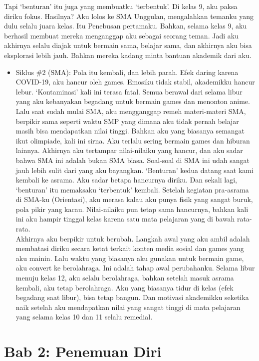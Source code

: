 \documentclass[
  letterpaper,
  DIV=11,
  numbers=noendperiod]{scrreprt}
\providecommand{\tightlist}{%
  \setlength{\itemsep}{0pt}\setlength{\parskip}{0pt}}
\begin{document}
Tapi `benturan' itu juga yang membuatku `terbentuk'. Di kelas 9, aku
paksa diriku fokus. Hasilnya? Aku lolos ke SMA Unggulan, mengalahkan
temanku yang dulu selalu juara kelas. Itu Penebusan pertamaku. Bahkan,
selama kelas 9, aku berhasil membuat mereka menganggap aku sebagai
seorang teman. Jadi aku akhirnya selalu diajak untuk bermain sama,
belajar sama, dan akhirnya aku bisa eksplorasi lebih jauh. Bahkan mereka
kadang minta bantuan akademik dari aku.

\begin{itemize}
\tightlist
\item
  Siklus \#2 (SMA): Pola itu kembali, dan lebih parah. Efek daring
  karena COVID-19, aku hancur oleh games. Emosiku tidak stabil,
  akademikku hancur lebur. `Kontaminasi' kali ini terasa fatal. Semua
  berawal dari selama libur yang aku kebanyakan begadang untuk bermain
  games dan menonton anime. Lalu saat sudah mulai SMA, aku mengganggap
  remeh materi-materi SMA, berpikir sama seperti waktu SMP yang dimana
  aku tidak pernah belajar masih bisa mendapatkan nilai tinggi. Bahkan
  aku yang biasanya semangat ikut olimpiade, kali ini sirna. Aku terlalu
  sering bermain games dan hiburan lainnya. Akhirnya aku tertampar
  nilai-nilaiku yang hancur, dan aku sadar bahwa SMA ini adalah bukan
  SMA biasa. Soal-soal di SMA ini udah sangat jauh lebih sulit dari yang
  aku bayangkan. `Benturan' kedua datang saat kami kembali ke asrama.
  Aku sadar betapa hancurnya diriku. Dan sekali lagi, `benturan' itu
  memaksaku `terbentuk' kembali. Setelah kegiatan pra-asrama di SMA-ku
  (Orientasi), aku merasa kalau aku punya fisik yang sangat buruk, pola
  pikir yang kacau. Nilai-nilaiku pun tetap sama hancurnya, bahkan kali
  ini aku hampir tinggal kelas karena satu mata pelajaran yang di bawah
  rata-rata.\\
  Akhirnya aku berpikir untuk berubah. Langkah awal yang aku ambil
  adalah membatasi diriku secara ketat terkait konten media sosial dan
  games yang aku mainin. Lalu waktu yang biasanya aku gunakan untuk
  bermain game, aku convert ke berolahraga. Ini adalah tahap awal
  perubahanku. Selama libur menuju kelas 12, aku selalu berolahraga,
  bahkan setelah masuk asrama kembali, aku tetap berolahraga. Aku yang
  biasanya tidur di kelas (efek begadang saat libur), bisa tetap bangun.
  Dan motivasi akademikku seketika naik setelah aku mendapatkan nilai
  yang sangat tinggi di mata pelajaran yang selama kelas 10 dan 11
  selalu remedial.
\end{itemize}

\section{\texorpdfstring{\textbf{Bab 2: Penemuan
Diri}}{Bab 2: Penemuan Diri}}\label{bab-2-penemuan-diri}
\end{document}
